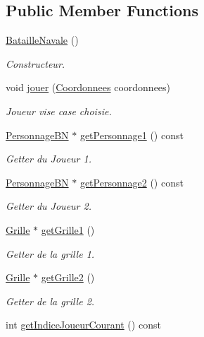 \subsection*{Public Member Functions}
\begin{DoxyCompactItemize}
\item 
\hyperlink{classBatailleNavale_a74cc728a7d2f09243e938cca13c16f59}{Bataille\-Navale} ()
\begin{DoxyCompactList}\small\item\em Constructeur. \end{DoxyCompactList}\item 
void \hyperlink{classBatailleNavale_a2dae6d08ff0e391f23e2775ff01de3d0}{jouer} (\hyperlink{classCoordonnees}{Coordonnees} coordonnees)
\begin{DoxyCompactList}\small\item\em Joueur vise case choisie. \end{DoxyCompactList}\item 
\hyperlink{classPersonnageBN}{Personnage\-B\-N} $\ast$ \hyperlink{classBatailleNavale_a06536e39a82ccaee6cc415a79d471427}{get\-Personnage1} () const 
\begin{DoxyCompactList}\small\item\em Getter du Joueur 1. \end{DoxyCompactList}\item 
\hyperlink{classPersonnageBN}{Personnage\-B\-N} $\ast$ \hyperlink{classBatailleNavale_a21fdc28f984238126557f7a5d5a005ba}{get\-Personnage2} () const 
\begin{DoxyCompactList}\small\item\em Getter du Joueur 2. \end{DoxyCompactList}\item 
\hyperlink{classGrille}{Grille} $\ast$ \hyperlink{classBatailleNavale_a8af0c5c56b59b7fbbf13e40f3bd1d703}{get\-Grille1} ()
\begin{DoxyCompactList}\small\item\em Getter de la grille 1. \end{DoxyCompactList}\item 
\hyperlink{classGrille}{Grille} $\ast$ \hyperlink{classBatailleNavale_a14d7cccff168cd71b0dedaa9f9b1cb68}{get\-Grille2} ()
\begin{DoxyCompactList}\small\item\em Getter de la grille 2. \end{DoxyCompactList}\item 
int \hyperlink{classBatailleNavale_a3ad348fe72fe0c727ffb59aea478a2f1}{get\-Indice\-Joueur\-Courant} () const 

\end{DoxyCompactItemize}
